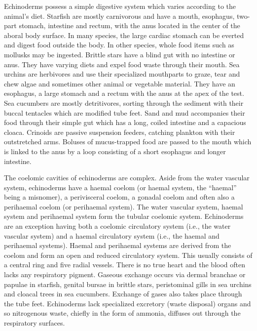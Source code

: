 \documentclass[]{book}
\theoremstyle{definition}
\theoremstyle{definition}
\theoremstyle{definition}
\theoremstyle{remark}
\begin{document}
Echinoderms possess a simple digestive system which varies according to
the animal's diet. Starfish are mostly carnivorous and have a mouth,
esophagus, two-part stomach, intestine and rectum, with the anus located
in the center of the aboral body surface. In many species, the large
cardiac stomach can be everted and digest food outside the body. In
other species, whole food items such as mollusks may be ingested.
Brittle stars have a blind gut with no intestine or anus. They have
varying diets and expel food waste through their mouth. Sea urchins are
herbivores and use their specialized mouthparts to graze, tear and chew
algae and sometimes other animal or vegetable material. They have an
esophagus, a large stomach and a rectum with the anus at the apex of the
test. Sea cucumbers are mostly detritivores, sorting through the
sediment with their buccal tentacles which are modified tube feet. Sand
and mud accompanies their food through their simple gut which has a
long, coiled intestine and a capacious cloaca. Crinoids are passive
suspension feeders, catching plankton with their outstretched arms.
Boluses of mucus-trapped food are passed to the mouth which is linked to
the anus by a loop consisting of a short esophagus and longer intestine.

The coelomic cavities of echinoderms are complex. Aside from the water
vascular system, echinoderms have a haemal coelom (or haemal system, the
``haemal'' being a misnomer), a perivisceral coelom, a gonadal coelom
and often also a perihaemal coelom (or perihaemal system). The water
vascular system, haemal system and perihaemal system form the tubular
coelomic system. Echinoderms are an exception having both a coelomic
circulatory system (i.e., the water vascular system) and a haemal
circulatory system (i.e., the haemal and perihaemal systems). Haemal and
perihaemal systems are derived from the coelom and form an open and
reduced circulatory system. This usually consists of a central ring and
five radial vessels. There is no true heart and the blood often lacks
any respiratory pigment. Gaseous exchange occurs via dermal branchae or
papulae in starfish, genital bursae in brittle stars, peristominal gills
in sea urchins and cloacal trees in sea cucumbers. Exchange of gases
also takes place through the tube feet. Echinoderms lack specialized
excretory (waste disposal) organs and so nitrogenous waste, chiefly in
the form of ammonia, diffuses out through the respiratory surfaces.
\end{document}

